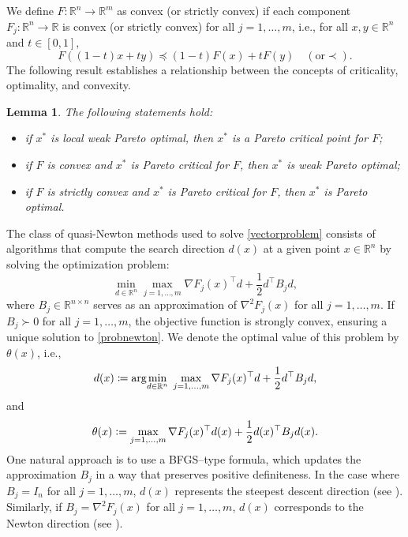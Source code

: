 \documentclass[11pt]{article}
\newtheorem{lemma}[theorem]{Lemma}
\numberwithin{assumption}{section}
\newcommand{\argmin}{{\rm arg}\!\min}
\newcommand{\R}{\mathbb{R}}
\newcommand{\HF}{\nabla^2 F}
\begin{document}
We define $F: \mathbb{R}^n \rightarrow \mathbb{R}^m$ as convex (or strictly convex) if each component $F_j: \mathbb{R}^n \rightarrow \mathbb{R}$ is convex (or strictly convex) for all $j = 1, \ldots, m$, i.e., for all $x,y \in\R^n$ and $t \in [0,1]$, 
\begin{equation}\label{eq:convex}
 F((1-t)x+ty)\preceq (1-t)F(x)+tF(y) \quad (\mbox{or} \prec).
 \end{equation}
The following result establishes a relationship between the concepts of criticality, optimality, and convexity.
\begin{lemma}\cite[Theorem 3.1]{mauriciobenarfliege}\label{Theo3.1-Bennar-Fliege} The following statements  hold:
	\begin{itemize}
		\item[(i)]  if $x^{\ast}$ is local weak Pareto optimal, then $x^{\ast}$ is a Pareto critical point for $F$;
		\item[(ii)]  if $F$ is convex and $x^{\ast}$ is Pareto critical for $F$, then $x^{\ast}$ is weak Pareto optimal;
		\item[(iii)]  if $F$ is strictly convex  and $x^{\ast}$ is Pareto critical for $F$, then $x^{\ast}$ is Pareto optimal.
	\end{itemize}
\end{lemma}


The class of quasi-Newton methods used to solve \eqref{vectorproblem} consists of algorithms that compute the search direction $d(x)$ at a given point $x \in \mathbb{R}^n$ by solving the optimization problem:
\begin{equation}\label{probnewton}
\min_{d\in\R^n} \max_{j=1,\ldots,m} \nabla F_j (x)^\top d + \frac{1}{2}d^\top B_j d,
\end{equation}
where $B_j\in \R^{n\times n}$ serves as an approximation of $\HF_j(x)$ for all $j=1,\ldots,m$. If $B_j\succ 0$ for all $j=1,\ldots,m$, the objective function is strongly convex, ensuring a unique solution to \eqref{probnewton}. We denote the optimal value of this problem by $\theta(x)$, i.e.,
 \begin{equation}{\label{direction}}
d(x)\coloneqq\argmin_{d \in \R^n}\; \max_{j = 1,\dots,m }\nabla F_j (x)^\top d + \frac{1}{2}d^\top B_j d,
\end{equation} 
and
\begin{equation}{\label{theta}}
\theta(x) : = \max_{j = 1,\dots,m } \nabla F_j (x)^\top d(x) + \frac{1}{2}d(x)^\top B_j d(x).
\end{equation}
One natural approach is to use a BFGS--type formula, which updates the approximation $B_j$ in a way that preserves positive definiteness.
In the case where $B_j=I_n$ for all $j=1,\ldots,m$, $d(x)$ represents the steepest descent direction (see \cite{benar&fliege}). Similarly, if $B_j=\HF_j(x)$ for all $j=1,\ldots,m$, $d(x)$ corresponds to the Newton direction (see \cite{mauriciobenarfliege}).
\end{document}
